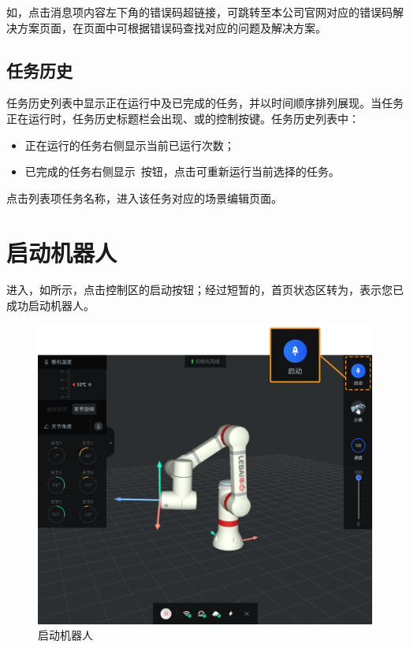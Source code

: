 如，点击消息项内容左下角的错误码超链接，可跳转至本公司官网对应的错误码解决方案页面，在页面中可根据错误码查找对应的问题及解决方案。

\subsection{任务历史}
\label{sec:任务历史}
任务历史列表中显示正在运行中及已完成的任务，并以时间顺序排列展现。当任务正在运行时，任务历史标题栏会出现、或的控制按键。任务历史列表中：
\begin{itemize}
	\item 正在运行的任务右侧显示当前已运行次数；
	\item 已完成的任务右侧显示~按钮，点击可重新运行当前选择的任务。
\end{itemize}

点击列表项任务名称，进入该任务对应的场景编辑页面。


\clearpage

\section{启动机器人}
进入\LM ，如所示，点击控制区的启动按钮；经过短暂的，首页状态区转为，表示您已成功启动机器人。

\begin{figure}[ht]
	\centering
	\includegraphics[width=\textwidth]{screen/2-16.png}
	\caption{启动机器人}
	\label{fig:启动机器人}
\end{figure}

